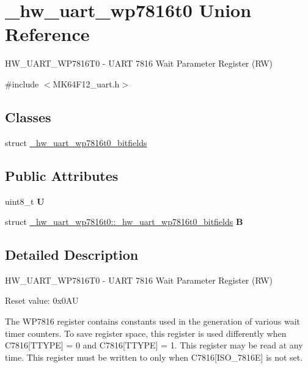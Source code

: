 \hypertarget{union__hw__uart__wp7816t0}{}\section{\+\_\+hw\+\_\+uart\+\_\+wp7816t0 Union Reference}
\label{union__hw__uart__wp7816t0}


H\+W\+\_\+\+U\+A\+R\+T\+\_\+\+W\+P7816\+T0 -\/ U\+A\+RT 7816 Wait Parameter Register (RW)  




{\ttfamily \#include $<$M\+K64\+F12\+\_\+uart.\+h$>$}

\subsection*{Classes}
\begin{DoxyCompactItemize}
\item 
struct \hyperlink{struct__hw__uart__wp7816t0_1_1__hw__uart__wp7816t0__bitfields}{\+\_\+hw\+\_\+uart\+\_\+wp7816t0\+\_\+bitfields}
\end{DoxyCompactItemize}
\subsection*{Public Attributes}
\begin{DoxyCompactItemize}
\item 
uint8\+\_\+t {\bfseries U}\hypertarget{union__hw__uart__wp7816t0_acb1dd43e7cf48469248d188c2052d07f}{}\label{union__hw__uart__wp7816t0_acb1dd43e7cf48469248d188c2052d07f}

\item 
struct \hyperlink{struct__hw__uart__wp7816t0_1_1__hw__uart__wp7816t0__bitfields}{\+\_\+hw\+\_\+uart\+\_\+wp7816t0\+::\+\_\+hw\+\_\+uart\+\_\+wp7816t0\+\_\+bitfields} {\bfseries B}\hypertarget{union__hw__uart__wp7816t0_ad136043defaa24db4045b1f3aa5370e5}{}\label{union__hw__uart__wp7816t0_ad136043defaa24db4045b1f3aa5370e5}

\end{DoxyCompactItemize}


\subsection{Detailed Description}
H\+W\+\_\+\+U\+A\+R\+T\+\_\+\+W\+P7816\+T0 -\/ U\+A\+RT 7816 Wait Parameter Register (RW) 

Reset value\+: 0x0\+AU

The W\+P7816 register contains constants used in the generation of various wait timer counters. To save register space, this register is used differently when C7816\mbox{[}T\+T\+Y\+PE\mbox{]} = 0 and C7816\mbox{[}T\+T\+Y\+PE\mbox{]} = 1. This register may be read at any time. This register must be written to only when C7816\mbox{[}I\+S\+O\+\_\+7816E\mbox{]} is not set. 

